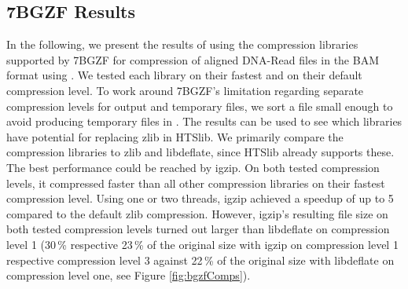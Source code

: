 \subsection{7BGZF Results}

In the following, we present the results of using the compression libraries supported by 7BGZF for compression of aligned DNA-Read files in the BAM format using \sort. We tested each library on their fastest and on their default compression level. To work around 7BGZF's limitation regarding separate compression levels for output and temporary files, we sort a file small enough to avoid producing temporary files in \sort. The results can be used to see which libraries have potential for replacing zlib in HTSlib. We primarily compare the compression libraries to zlib and libdeflate, since HTSlib already supports these.\\

The best performance could be reached by igzip. On both tested compression levels, it compressed faster than all other compression libraries on their fastest compression level. Using one or two threads, igzip achieved a speedup of up to 5 compared to the default zlib compression. However, igzip's resulting file size on both tested compression levels turned out larger than libdeflate on compression level 1 (30\,\% respective 23\,\% of the original size with igzip on compression level 1 respective compression level 3 against 22\,\% of the original size with libdeflate on compression level one, see Figure \ref{fig:bgzfComps}). 

